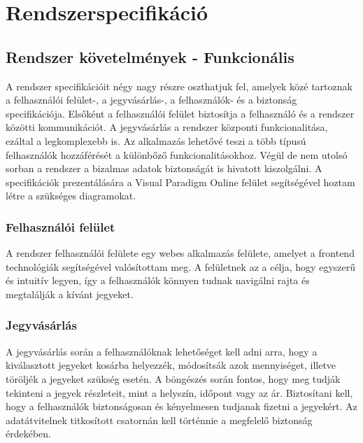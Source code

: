 \chapter{Rendszerspecifikáció} \label{fejezet3}

\section {Rendszer követelmények - Funkcionális}

A rendszer specifikációit négy nagy részre oszthatjuk fel, amelyek közé tartoznak a felhasználói felület-, a jegyvásárlás-, a felhasználók- és a biztonság specifikációja. Elsőként a felhasználói felület biztosítja a felhasználó és a rendszer közötti kommunikációt. A jegyvásárlás a rendszer központi funkcionalitása, ezáltal a legkomplexebb is. Az alkalmazás lehetővé teszi a több típusú felhasználók hozzáférését a különbőző funkcionalitásokhoz. Végül de nem utolsó sorban a rendszer a bizalmas adatok biztonságát is hivatott kiszolgálni. A specifikációk prezentálására a Visual Paradigm Online felület segítségével hoztam létre a szükséges diagramokat.

\subsection {Felhasználói felület}

A rendszer felhasználói felülete egy webes alkalmazás felülete, amelyet a frontend technológiák segítségével valósítottam meg. A felületnek az a célja, hogy egyszerű és intuitív legyen, így a felhasználók könnyen tudnak navigálni rajta és megtalálják a kívánt jegyeket.

\subsection {Jegyvásárlás}

A jegyvásárlás során a felhasználóknak lehetőséget kell adni arra, hogy a kiválasztott jegyeket kosárba helyezzék, módosítsák azok mennyiséget, illetve töröljék a jegyeket szükség esetén. A böngészés során fontos, hogy meg tudják tekinteni a jegyek részleteit, mint a helyszín, időpont vagy az ár.
Biztosítani kell, hogy a felhasználók biztonságosan és kényelmesen tudjanak fizetni a jegyekért. Az adatátvitelnek titkosított csatornán kell történnie a megfelelő biztonság érdekében.


